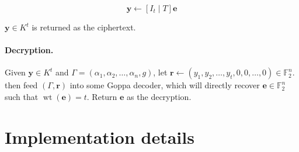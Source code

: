 \documentclass{article}
\begin{document}
$$\mathbf{y} \leftarrow [I_t \mid T] \mathbf{e}$$

$\mathbf{y} \in K^t$ is returned as the ciphertext.

\paragraph{Decryption.} Given $\mathbf{y} \in K^t$ and $\Gamma = (\alpha_1, \alpha_2, \ldots, \alpha_n, g)$, let $\mathbf{r} \leftarrow (y_1, y_2, \ldots, y_t, 0, 0, \ldots, 0) \in \mathbb{F}_2^n$. then feed $(\Gamma, \mathbf{r})$ into some Goppa decoder, which will directly recover $\mathbf{e} \in \mathbb{F}_2^n$ such that $\mathop{wt}(\mathbf{e}) = t$. Return $\mathbf{e}$ as the decryption.

\section{Implementation details}



\end{document}
